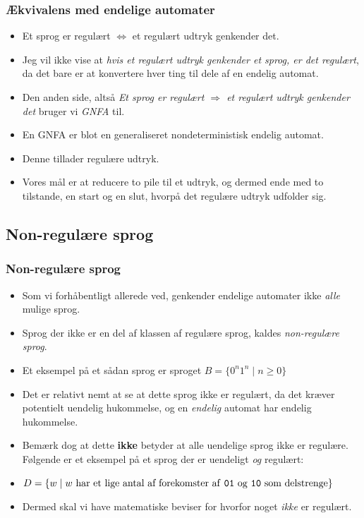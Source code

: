 \begin{frame}[allowframebreaks]
	\frametitle{Ækvivalens med endelige automater}
	\begin{itemize}
		\item Et sprog er regulært $\iff$ et regulært udtryk genkender det.
		\item Jeg vil ikke vise at \textit{hvis et regulært udtryk genkender et sprog, er det regulært}, da det bare er at konvertere hver ting til dele af en endelig automat.
		\item Den anden side, altså \textit{Et sprog er regulært \(\Rightarrow\) et regulært udtryk genkender det} bruger vi \textit{GNFA} til.
		\item En GNFA er blot en generaliseret nondeterministisk endelig automat.
		\item Denne tillader regulære udtryk.
		\item Vores mål er at reducere to pile til et udtryk, og dermed ende med to tilstande, en start og en slut, hvorpå det regulære udtryk udfolder sig.
	\end{itemize}
\end{frame}

\subsection{Non-regulære sprog}%
\label{subsec:nonregulæresprog}

\begin{frame}
	\frametitle{Non-regulære sprog}
	\begin{itemize}
		\item Som vi forhåbentligt allerede ved, genkender endelige automater ikke \textit{alle} mulige sprog.
		\item Sprog der ikke er en del af klassen af regulære sprog, kaldes \textit{non-regulære sprog}.
		\item Et eksempel på et sådan sprog er sproget $B = \{0^{n}1^{n} \mid n \ge 0\}$
		\item Det er relativt nemt at se at dette sprog ikke er regulært, da det kræver potentielt uendelig hukommelse, og en \textit{endelig} automat har endelig hukommelse.
		\item Bemærk dog at dette \textbf{ikke} betyder at alle uendelige sprog ikke er regulære. Følgende er et eksempel på et sprog der er uendeligt \textit{og} regulært:
		\item $D = \{w \mid w \text{ har et lige antal af forekomster af \texttt{01} og \texttt{10} som delstrenge}\}$
		\item Dermed skal vi have matematiske beviser for hvorfor noget \textit{ikke} er regulært.
	\end{itemize}
\end{frame}

